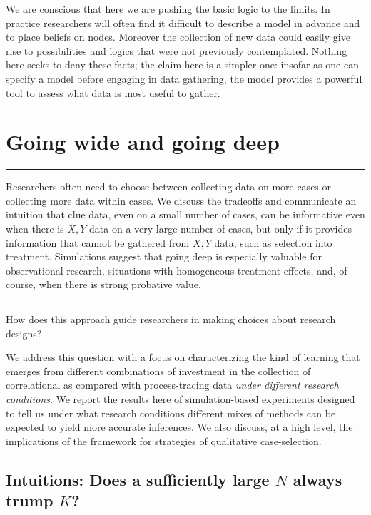 \documentclass[12pt,]{book}
\begin{document}
We are conscious that here we are pushing the basic logic to the limits. In practice researchers will often find it difficult to describe a model in advance and to place beliefs on nodes. Moreover the collection of new data could easily give rise to possibilities and logics that were not previously contemplated. Nothing here seeks to deny these facts; the claim here is a simpler one: insofar as one can specify a model before engaging in data gathering, the model provides a powerful tool to assess what data is most useful to gather.

\hypertarget{wide}{%
\chapter{Going wide and going deep}\label{wide}}

\begin{center}\rule{0.5\linewidth}{\linethickness}\end{center}

Researchers often need to choose between collecting data on more cases or collecting more data within cases. We discuss the tradeoffs and communicate an intuition that clue data, even on a small number of cases, can be informative even when there is \(X, Y\) data on a very large number of cases, but only if it provides information that cannot be gathered from \(X,Y\) data, such as selection into treatment. Simulations suggest that going deep is especially valuable for observational research, situations with homogeneous treatment effects, and, of course, when there is strong probative value.

\begin{center}\rule{0.5\linewidth}{\linethickness}\end{center}

How does this approach guide researchers in making choices about research designs?

We address this question with a focus on characterizing the kind of learning that emerges from different combinations of investment in the collection of correlational as compared with process-tracing data \emph{under different research conditions}. We report the results here of simulation-based experiments designed to tell us under what research conditions different mixes of methods can be expected to yield more accurate inferences. We also discuss, at a high level, the implications of the framework for strategies of qualitative case-selection.

\hypertarget{intuitions-does-a-sufficiently-large-n-always-trump-k}{%
\section{\texorpdfstring{Intuitions: Does a sufficiently large \(N\) always trump \(K\)?}{Intuitions: Does a sufficiently large N always trump K?}}\label{intuitions-does-a-sufficiently-large-n-always-trump-k}}
\end{document}
